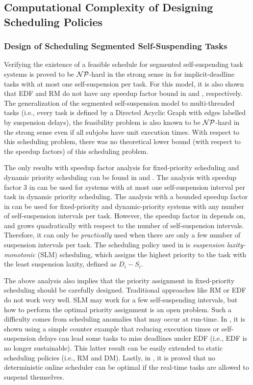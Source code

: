 \subsection{Computational Complexity of Designing Scheduling Policies}

\subsubsection{Design of Scheduling Segmented Self-Suspending Tasks}
Verifying the existence of a feasible schedule for segmented self-suspending task systems is proved to be ${\cal NP}$-hard in the strong sense in \cite{Ridouard_2004} for implicit-deadline tasks with at most one self-suspension per task. For this model, it is also shown that EDF and RM do not have any speedup factor bound in \cite{Ridouard_2004} and \cite{RTSS-ChenL14}, respectively. The generalization of the segmented self-suspension model to multi-threaded tasks (i.e., every task is defined by a Directed Acyclic Graph with edges labelled by suspension delays), the feasibility problem is also known to be  ${\cal NP}$-hard in the strong sense  \cite{Ric03} even if all subjobs have unit execution times. With respect to this scheduling problem, there was no theoretical lower bound (with respect to the speedup factors) of this scheduling problem. 

 The only results with speedup factor analysis for fixed-priority scheduling and dynamic priority scheduling can be found in \cite{RTSS-ChenL14} and \cite{WC16-suspend-DATE}. The analysis with speedup factor $3$ in \cite{RTSS-ChenL14} can be used for systems with at most one self-suspension interval per task in dynamic priority scheduling. The analysis with a bounded speedup factor in \cite{WC16-suspend-DATE} can be used for fixed-priority and dynamic-priority systems with any number of self-suspension intervals per task. However, the speedup factor in \cite{WC16-suspend-DATE} depends on, and grows quadratically with respect to the number of self-suspension intervals. Therefore, it can only be \emph{practically} used when there are only a few number of suspension intervals per task. The scheduling policy used in \cite{WC16-suspend-DATE} is \emph{suspension laxity-monotonic} (SLM) scheduling, which assigns the highest priority to the task with the least suspension laxity, defined as $D_i-S_i$.


The above analysis also implies that the priority assignment in fixed-priority scheduling should be carefully designed. Traditional approaches like RM or EDF do not work very well. SLM may work for a few self-suspending intervals, but how to perform the optimal priority assignment is an open problem. Such a difficulty comes from scheduling anomalies that may occur at run-time. In \cite{Ridouard_2004}, it is shown using a simple counter example that reducing execution times or self-suspension delays can lead some tasks to miss deadlines under EDF (i.e., EDF is no longer sustainable). This latter result can be easily extended to static scheduling policies (i.e., RM and DM). Lastly, in \cite{RidouardR06}, it is proved that no deterministic online scheduler can be optimal if the real-time tasks are allowed to suspend themselves.




